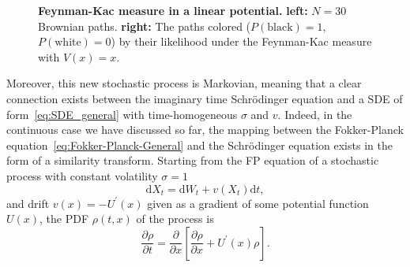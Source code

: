\begin{figure}[t]
	\centering
	\caption[Feynman-Kac measure in a linear potential]{\textbf{Feynman-Kac measure in a linear potential.} 
		\textbf{left:} $N=30$ Brownian paths. \textbf{right:} The paths colored ($P(\text{black})=1$, $P(\text{white})=0$) by their likelihood under the Feynman-Kac measure with $V(x)=x$.}
	\label{fig:fkac_measure_reweight}
\end{figure}
\noindent
Moreover, this new stochastic process is Markovian, meaning that a clear connection exists between the imaginary time Schr\" odinger equation and a SDE of form~\eqref{eq:SDE_general} with time-homogeneous $\sigma$ and $v$.
Indeed, in the continuous case we have discussed so far, the mapping between the Fokker-Planck equation~\eqref{eq:Fokker-Planck-General} and the Schr\" odinger equation exists in the form of a similarity transform. Starting from the FP equation of a stochastic process with constant volatility $\sigma = 1$
\begin{equation}
\label{eq:not_prime_cont_process}
\mathrm{d} X_{t}=\mathrm{d} W_{t}+v\left(X_{t}\right) \mathrm{d} t,
\end{equation} 
and drift $v(x)=-U^\prime(x)$ given as a gradient of some potential function $U(x)$, the PDF $\rho(t, x)$ of the process is
\begin{equation}
\frac{\partial \rho}{\partial t} = \frac{\partial}{\partial x}\left[\frac{\partial \rho}{\partial x}+U^{\prime}(x) \rho\right].
\end{equation}
